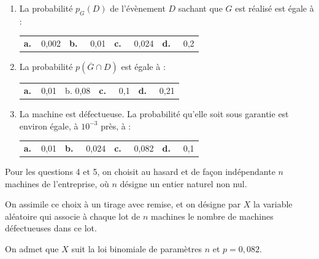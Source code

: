 \documentclass[10pt]{article}
\begin{document}
\medskip

\begin{enumerate}
\item La probabilité $p_G(D)$ de l'évènement $D$ sachant que $G$ est réalisé est égale à :
\begin{center}
\begin{tabularx}{\linewidth}{*{4}{X}}
\textbf{a.~~}0,002 &\textbf{b.~~} 0,01 &\textbf{c.~~} 0,024 & \textbf{d.~~} 0,2
\end{tabularx}
\end{center}

\item La probabilité $p\left(\overline{G} \cap D\right)$ est égale à :
\begin{center}
\begin{tabularx}{\linewidth}{*{4}{X}}
\textbf{a.~~}0,01 &b. 0,08 &\textbf{c.~~} 0,1  &\textbf{d.~~} 0,21
\end{tabularx}
\end{center}
\item La machine est défectueuse. La probabilité qu'elle soit sous garantie est
environ égale, à $10^{-3}$ près, à : 
\begin{center}
\begin{tabularx}{\linewidth}{*{4}{X}}
\textbf{a.~~}0,01  &\textbf{b.~~} 0,024  &\textbf{c.~~} 0,082 &\textbf{d.~~} 0,1
\end{tabularx}
\end{center}

\end{enumerate}

Pour les questions 4 et 5, on choisit au hasard et de façon indépendante $n$ machines de l'entreprise, où $n$ désigne un entier naturel non nul. 

On assimile ce choix à un tirage avec remise, et on désigne par $X$ la variable aléatoire qui associe à chaque lot de $n$ machines le nombre de machines défectueuses dans ce lot.

On admet que $X$ suit la loi binomiale de paramètres $n$ et $p = 0,082$.
\end{document}
